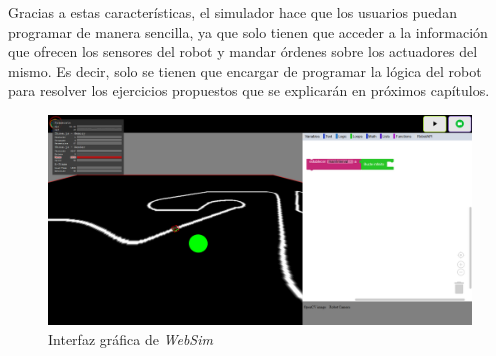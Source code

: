 Gracias a estas características, el simulador hace que los usuarios puedan programar de manera sencilla, ya que solo tienen que acceder a la información que ofrecen los sensores del robot y mandar órdenes sobre los actuadores del mismo. Es decir, solo  se tienen que encargar de programar la lógica del robot para resolver los ejercicios propuestos que se explicarán en próximos capítulos. 


\begin{figure}[H]
    \centering
    \includegraphics[width=1\textwidth]{img/interfaz-websim.png}
    \caption{Interfaz gráfica de \textit{WebSim}} \label{fig:websim}
\end{figure}

